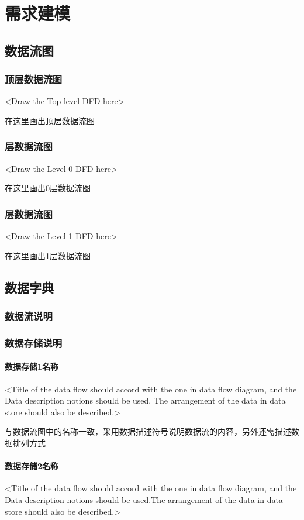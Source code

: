 \chapter{需求建模 }
\section{数据流图}
\subsection{顶层数据流图}
<Draw the Top-level DFD here>

在这里画出顶层数据流图

\subsection{层数据流图}
<Draw the Level-0 DFD here>

在这里画出0层数据流图

\subsection{层数据流图}
<Draw the Level-1 DFD here>

在这里画出1层数据流图

\section{数据字典}
\subsection{数据流说明}
\subsection{数据存储说明}
\subsubsection{数据存储1名称}
<Title of  the data flow should accord with the one in data flow diagram, and the Data description notions should be used. The arrangement of the data in data store should also be described.>

与数据流图中的名称一致，采用数据描述符号说明数据流的内容，另外还需描述数据排列方式

\subsubsection{数据存储2名称}
<Title of  the data flow should accord with the one in data flow diagram, and the Data description notions should be used.The arrangement of the data in data store should also be described.>

